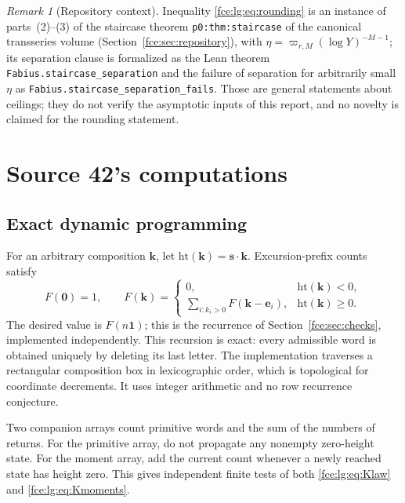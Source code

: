 \documentclass[11pt,a4paper]{article}
\numberwithin{equation}{section}
\theoremstyle{definition}\newtheorem{definition}[theorem]{Definition}
\theoremstyle{remark}\newtheorem{remark}[theorem]{Remark}
\newcommand{\one}{\boldsymbol 1}
\begin{document}
\begin{remark}[Repository context]\label{fce:lg:rem:staircase}
Inequality \eqref{fce:lg:eq:rounding} is an instance of parts~(2)--(3) of
the staircase theorem \texttt{p0:thm:staircase} of the canonical
transseries volume (Section~\ref{fce:sec:repository}), with
$\eta=\varpi_{r,M}(\log Y)^{-M-1}$; its separation clause is formalized as
the Lean theorem \texttt{Fabius.staircase\_separation} and the failure of
separation for arbitrarily small $\eta$ as
\texttt{Fabius.staircase\_separation\_fails}. Those are general statements
about ceilings; they do not verify the asymptotic inputs of this report,
and no novelty is claimed for the rounding statement.
\end{remark}

\section{Source 42's computations}\label{fce:lg:sec:checks}
\subsection{Exact dynamic programming}
For an arbitrary composition $\boldsymbol k$, let
$\mathrm{ht}(\boldsymbol k)=\boldsymbol s\cdot\boldsymbol k$. Excursion-prefix
counts satisfy
\begin{equation}\label{fce:lg:eq:dp}
 F(\boldsymbol0)=1,\qquad
 F(\boldsymbol k)=\begin{cases}
 0,&\mathrm{ht}(\boldsymbol k)<0,\\
 \displaystyle\sum_{i:k_i>0}F(\boldsymbol k-\boldsymbol e_i),&\mathrm{ht}(\boldsymbol k)\ge0.
 \end{cases}
\end{equation}
The desired value is $F(n\one)$; this is the recurrence of
Section~\ref{fce:sec:checks}, implemented independently. This recursion is
exact: every admissible word is obtained uniquely by deleting its last
letter. The implementation traverses a rectangular composition box in
lexicographic order, which is topological for coordinate decrements. It
uses integer arithmetic and no row recurrence conjecture.

Two companion arrays count primitive words and the sum of the numbers of
returns. For the primitive array, do not propagate any nonempty
zero-height state. For the moment array, add the current count whenever a
newly reached state has height zero. This gives independent finite tests of
both \eqref{fce:lg:eq:Klaw} and \eqref{fce:lg:eq:Kmoments}.
\end{document}
